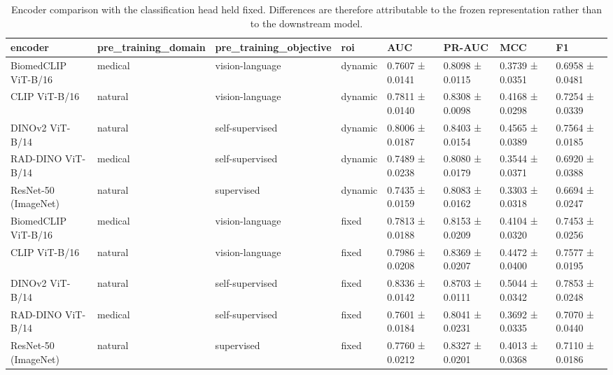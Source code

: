 \begin{table}
\caption{Encoder comparison with the classification head held fixed. Differences are therefore attributable to the frozen representation rather than to the downstream model.}
\label{tab:phase3-encoders}
\begin{tabular}{llllllll}
\toprule
encoder & pre\_training\_domain & pre\_training\_objective & roi & AUC & PR-AUC & MCC & F1 \\
\midrule
BiomedCLIP ViT-B/16 & medical & vision-language & dynamic & 0.7607 ± 0.0141 & 0.8098 ± 0.0115 & 0.3739 ± 0.0351 & 0.6958 ± 0.0481 \\
CLIP ViT-B/16 & natural & vision-language & dynamic & 0.7811 ± 0.0140 & 0.8308 ± 0.0098 & 0.4168 ± 0.0298 & 0.7254 ± 0.0339 \\
DINOv2 ViT-B/14 & natural & self-supervised & dynamic & 0.8006 ± 0.0187 & 0.8403 ± 0.0154 & 0.4565 ± 0.0389 & 0.7564 ± 0.0185 \\
RAD-DINO ViT-B/14 & medical & self-supervised & dynamic & 0.7489 ± 0.0238 & 0.8080 ± 0.0179 & 0.3544 ± 0.0371 & 0.6920 ± 0.0388 \\
ResNet-50 (ImageNet) & natural & supervised & dynamic & 0.7435 ± 0.0159 & 0.8083 ± 0.0162 & 0.3303 ± 0.0318 & 0.6694 ± 0.0247 \\
BiomedCLIP ViT-B/16 & medical & vision-language & fixed & 0.7813 ± 0.0188 & 0.8153 ± 0.0209 & 0.4104 ± 0.0320 & 0.7453 ± 0.0256 \\
CLIP ViT-B/16 & natural & vision-language & fixed & 0.7986 ± 0.0208 & 0.8369 ± 0.0207 & 0.4472 ± 0.0400 & 0.7577 ± 0.0195 \\
DINOv2 ViT-B/14 & natural & self-supervised & fixed & 0.8336 ± 0.0142 & 0.8703 ± 0.0111 & 0.5044 ± 0.0342 & 0.7853 ± 0.0248 \\
RAD-DINO ViT-B/14 & medical & self-supervised & fixed & 0.7601 ± 0.0184 & 0.8041 ± 0.0231 & 0.3692 ± 0.0335 & 0.7070 ± 0.0440 \\
ResNet-50 (ImageNet) & natural & supervised & fixed & 0.7760 ± 0.0212 & 0.8327 ± 0.0201 & 0.4013 ± 0.0368 & 0.7110 ± 0.0186 \\
\bottomrule
\end{tabular}
\end{table}
